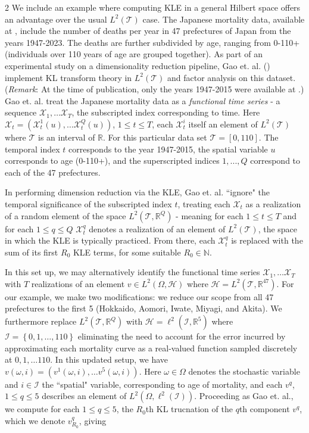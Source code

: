 \documentclass{article}
\numberwithin{theorem}{section}
\numberwithin{lemma}{section}
\numberwithin{definition}{section}
\numberwithin{assumption}{section}
\numberwithin{proposition}{section}
\numberwithin{remark}{section}
\numberwithin{corollary}{section}
\numberwithin{conjecture}{section}
\numberwithin{example}{section}
\newcommand{\R}{\mathbb{R}}
\newcommand{\N}{\mathbb{N}}
\newcommand{\bset}[1]{\left \lbrace #1 \right \rbrace}
\begin{document}
\begin{multicols*}{2}
We include an example where computing KLE in a general Hilbert space offers an advantage over the usual $L^2(\mathcal T)$ case. The Japanese mortality data, available at \cite{japan2023}, include the number of deaths per year in 47 prefectures of Japan from the years 1947-2023. The deaths are further subdivided by age, ranging from 0-110+ (individuals over 110 years of age are grouped together). As part of an experimental study on a dimensionality reduction pipeline, Gao et. al. (\cite{gao2017}) implement KL transform theory in $L^2(\mathcal T)$ and factor analysis on this dataset. (\textit{Remark}: At the time of publication, only the years 1947-2015 were available at \cite{japan2023}.) Gao et. al. treat the Japanese mortality data as a \textit{functional time series} - a sequence $\pmb{\mathcal X}_1, \dots \pmb{\mathcal X}_T$, the subscripted index corresponding to time. Here $\pmb{\mathcal X}_t = (\mathcal X_t^1(u), \dots \mathcal X_t^Q(u))$, $1 \leq t \leq T$, each $\mathcal X_t^i$ itself an element of $L^2(\mathcal T)$ where $\mathcal T $ is an interval of $\R$. For this particular data set $\mathcal T = [0, 110]$. The temporal index $t$ corresponds to the year 1947-2015, the spatial variable $u$ corresponds to age (0-110+), and the superscripted indices $1,...,Q$ correspond to each of the 47 prefectures.

In performing dimension reduction via the KLE, Gao et. al. ``ignore" the temporal significance of the subscripted index $t$, treating each $\pmb{\mathcal X}_t$ as a realization of a random element of the space $L^2(\mathcal T, \R^Q)$ - meaning for each $1 \leq t \leq T$ and for each $1 \leq q \leq Q$ $\mathcal X_t^q$ denotes a realization of an element of $L^2(\mathcal T)$, the space in which the KLE is typically practiced. From there, each $\mathcal X_t^q$ is replaced with the sum of its first $R_0$ KLE terms, for some suitable $R_0 \in \N$. 

In this set up, we may alternatively identify the functional time series $\pmb{\mathcal X}_1, \dots \pmb{\mathcal X}_T$ with $T$ realizations of an element $v \in L^2(\Omega, \mathcal H)$ where $\mathcal H = L^2(\mathcal T, \R^{47})$. For our example, we make two modifications: we reduce our scope from all 47 prefectures to the first 5 (Hokkaido, Aomori, Iwate, Miyagi, and Akita). We furthermore replace $L^2(\mathcal T, \R^Q)$ with $\mathcal H = \ell^2(\mathcal I, \R^5 )$ where $\mathcal I = \bset{0,1,\dots, 110}$ eliminating the need to account for the error incurred by approximating each mortality curve as a real-valued function sampled discretely at ${0,1, \dots 110}$. In this updated setup, we have $v(\omega, i) = (v^1(\omega,i), \dots v^5(\omega, i))$. Here $\omega \in \Omega$ denotes the stochastic variable and $i \in \mathcal I$ the ``spatial" variable, corresponding to age of mortality, and each $v^q$, $1 \leq q \leq 5$ describes an element of $L^2(\Omega, \ell^2(\mathcal I))$. Proceeding as Gao et. al., we compute for each $1 \leq q \leq 5$, the $R_0$th KL trucnation of the $q$th component $v^q$, which we denote $v^q_{R_0}$, giving 


\end{multicols*}
\end{document}

